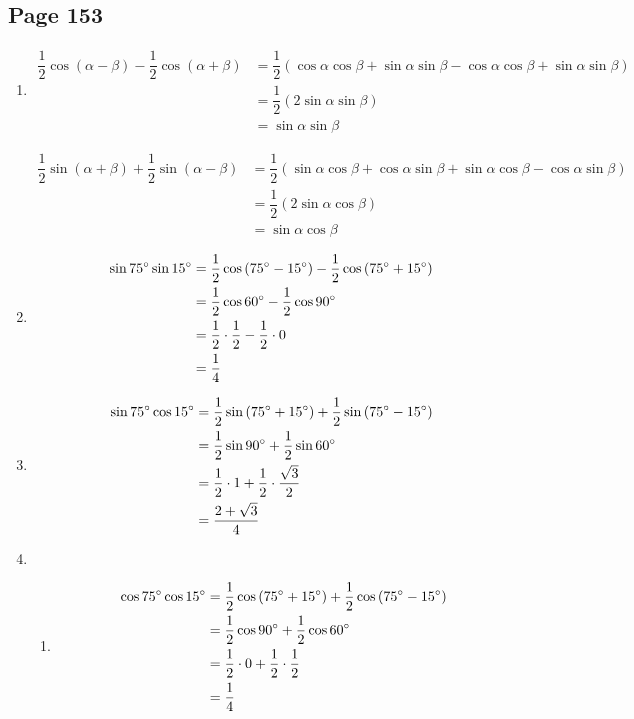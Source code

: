 \documentclass{article}
\newenvironment{solutions}[1]
{\subsection*{#1}
 \begin{enumerate}[leftmargin=1.5em]}
{\end{enumerate}}
\newcommand{\solution}{\item}
\newenvironment{subsolutions}
{\begin{enumerate}}
{\end{enumerate}}
\newcommand{\subsolution}{\item}
\begin{document}
\begin{solutions}{Page 153}
\solution %
\begin{align*}
\dfrac{1}{2}\cos\left(\alpha-\beta\right) - \dfrac{1}{2}\cos\left(\alpha+\beta\right) &= \dfrac{1}{2}\left(\cos{\alpha}\cos{\beta}+\sin{\alpha}\sin{\beta}-\cos{\alpha}\cos{\beta} + \sin{\alpha}\sin{\beta}\right) \\
&= \dfrac{1}{2}\left(2\sin{\alpha}\sin{\beta}\right) \\
&= \sin{\alpha}\sin{\beta}
\end{align*}

\begin{align*}
\dfrac{1}{2}\sin\left(\alpha+\beta\right) + \dfrac{1}{2}\sin\left(\alpha-\beta\right) &= \dfrac{1}{2}\left(\sin{\alpha}\cos{\beta}+\cos{\alpha}\sin{\beta}+\sin{\alpha}\cos{\beta} - \cos{\alpha}\sin{\beta}\right) \\
&= \dfrac{1}{2}\left(2\sin{\alpha}\cos{\beta}\right) \\
&= \sin{\alpha}\cos{\beta}
\end{align*}

\solution %
\begin{align*}
\sin{75\degree}\sin{15\degree} &= \dfrac{1}{2}\cos\left(75\degree-15\degree\right) - \dfrac{1}{2}\cos\left(75\degree+15\degree\right) \\
&= \dfrac{1}{2}\cos{60\degree} - \dfrac{1}{2}\cos{90\degree} \\
&= \dfrac{1}{2} \cdot \dfrac{1}{2} - \dfrac{1}{2} \cdot 0 \\
&= \dfrac{1}{4}
\end{align*}

\solution %
\begin{align*}
\sin{75\degree}\cos{15\degree} &= \dfrac{1}{2}\sin\left(75\degree+15\degree\right) + \dfrac{1}{2}\sin\left(75\degree-15\degree\right) \\
&= \dfrac{1}{2}\sin{90\degree} + \dfrac{1}{2}\sin{60\degree} \\
&= \dfrac{1}{2} \cdot 1 + \dfrac{1}{2} \cdot \dfrac{\sqrt{3}}{2} \\
&= \dfrac{2+\sqrt{3}}{4}
\end{align*}

\solution %
\begin{subsolutions}
\subsolution %
\begin{align*}
\cos{75\degree}\cos{15\degree} &= \dfrac{1}{2}\cos\left(75\degree+15\degree\right) + \dfrac{1}{2}\cos\left(75\degree-15\degree\right) \\
&= \dfrac{1}{2}\cos{90\degree} + \dfrac{1}{2}\cos{60\degree} \\
&= \dfrac{1}{2} \cdot 0 + \dfrac{1}{2} \cdot \dfrac{1}{2} \\
&= \dfrac{1}{4}
\end{align*}


\end{subsolutions}
\end{solutions}
\end{document}
